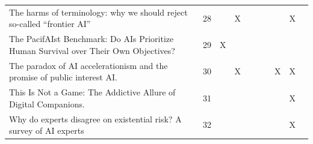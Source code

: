 \begin{landscape}
\begin{longtable}{|p{14cm}|c|c|c|c|c|c|c|c|c|}
		The harms of terminology: why we should reject so-called ``frontier AI''                                                                                 & 28          &                                    & X                                                         &                                                       &                                                            &                                           &                                              & X                                                  &                                    \\
		The PacifAIst Benchmark: Do AIs Prioritize Human Survival over Their Own Objectives?                                                                    & 29          & X                                  &                                                           &                                                       &                                                            &                                           &                                              &                                                    &                                    \\
		The paradox of AI accelerationism and the promise of public interest AI.                                                                                & 30          &                                    & X                                                         &                                                       &                                                            &                                           & X                                            & X                                                  &                                    \\
		This Is Not a Game: The Addictive Allure of Digital Companions.                                                                                         & 31          &                                    &                                                           &                                                       &                                                            &                                           &                                              & X                                                  &                                    \\
		Why do experts disagree on existential risk? A survey of AI experts                                                                                     & 32          &                                    &                                                           &                                                       &                                                            &                                           &                                              & X                                                  &                                    \\

\end{longtable}
\end{landscape}
